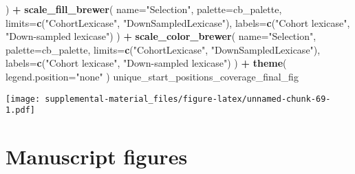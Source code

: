 \documentclass[]{book}
\newenvironment{Shaded}{\begin{snugshade}}{\end{snugshade}}
\newcommand{\DataTypeTok}[1]{\textcolor[rgb]{0.13,0.29,0.53}{#1}}
\newcommand{\KeywordTok}[1]{\textcolor[rgb]{0.13,0.29,0.53}{\textbf{#1}}}
\newcommand{\NormalTok}[1]{#1}
\newcommand{\OperatorTok}[1]{\textcolor[rgb]{0.81,0.36,0.00}{\textbf{#1}}}
\newcommand{\StringTok}[1]{\textcolor[rgb]{0.31,0.60,0.02}{#1}}
\begin{document}
\begin{Shaded}
\begin{Highlighting}[]
\NormalTok{  ) }\OperatorTok{+}
\StringTok{  }\KeywordTok{scale_fill_brewer}\NormalTok{(}
    \DataTypeTok{name=}\StringTok{"Selection"}\NormalTok{,}
    \DataTypeTok{palette=}\NormalTok{cb_palette,}
    \DataTypeTok{limits=}\KeywordTok{c}\NormalTok{(}\StringTok{"CohortLexicase"}\NormalTok{, }\StringTok{"DownSampledLexicase"}\NormalTok{),}
    \DataTypeTok{labels=}\KeywordTok{c}\NormalTok{(}\StringTok{"Cohort lexicase"}\NormalTok{, }\StringTok{"Down-sampled lexicase"}\NormalTok{)}
\NormalTok{  ) }\OperatorTok{+}
\StringTok{  }\KeywordTok{scale_color_brewer}\NormalTok{(}
    \DataTypeTok{name=}\StringTok{"Selection"}\NormalTok{,}
    \DataTypeTok{palette=}\NormalTok{cb_palette,}
    \DataTypeTok{limits=}\KeywordTok{c}\NormalTok{(}\StringTok{"CohortLexicase"}\NormalTok{, }\StringTok{"DownSampledLexicase"}\NormalTok{),}
    \DataTypeTok{labels=}\KeywordTok{c}\NormalTok{(}\StringTok{"Cohort lexicase"}\NormalTok{, }\StringTok{"Down-sampled lexicase"}\NormalTok{)}
\NormalTok{  ) }\OperatorTok{+}
\StringTok{  }\KeywordTok{theme}\NormalTok{(}
    \DataTypeTok{legend.position=}\StringTok{"none"}
\NormalTok{  )}
\NormalTok{unique_start_positions_coverage_final_fig}
\end{Highlighting}
\end{Shaded}

\texttt{[image: supplemental-material\_files/figure-latex/unnamed-chunk-69-1.pdf]}

\hypertarget{manuscript-figures-6}{%
\section{Manuscript figures}\label{manuscript-figures-6}}
\end{document}
